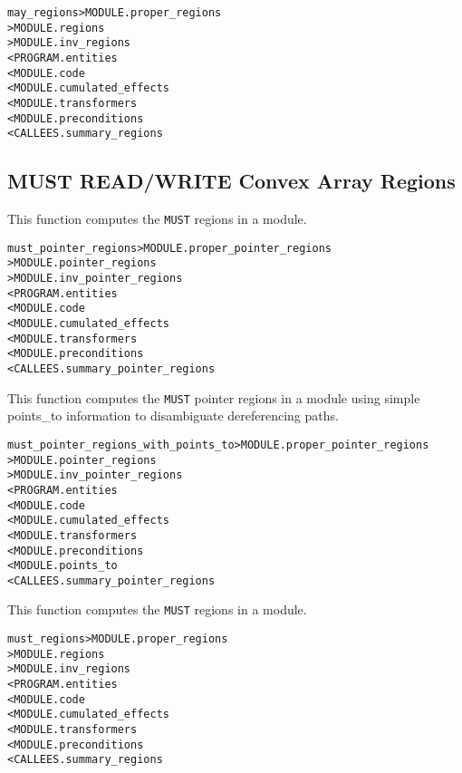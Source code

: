 \documentclass[a4paper]{report}
\newenvironment{PipsMake}{\begin{alltt}}{\end{alltt}}
\newenvironment{PipsPass}[1]{\label{pass:#1}}{}
\begin{document}
\begin{PipsMake}
may_regions                     > MODULE.proper_regions
                                > MODULE.regions
                                > MODULE.inv_regions
        < PROGRAM.entities
        < MODULE.code
        < MODULE.cumulated_effects
        < MODULE.transformers
        < MODULE.preconditions
        < CALLEES.summary_regions
\end{PipsMake}

\subsection{MUST READ/WRITE Convex Array Regions}
\label{subsubsection-must-regions}

\begin{PipsPass}{must_pointer_regions}
This function computes the \verb|MUST| regions in a module.
\end{PipsPass}

\begin{PipsMake}
must_pointer_regions            > MODULE.proper_pointer_regions
                                > MODULE.pointer_regions
                                > MODULE.inv_pointer_regions
        < PROGRAM.entities
        < MODULE.code
        < MODULE.cumulated_effects
        < MODULE.transformers
        < MODULE.preconditions
        < CALLEES.summary_pointer_regions
\end{PipsMake}

\begin{PipsPass}{must_pointer_regions_with_points_to}
  This function computes the \verb|MUST| pointer regions in a module
  using simple points\_to information to disambiguate dereferencing paths.
\end{PipsPass}
\begin{PipsMake}
must_pointer_regions_with_points_to > MODULE.proper_pointer_regions
                                    > MODULE.pointer_regions
                                    > MODULE.inv_pointer_regions
        < PROGRAM.entities
        < MODULE.code
        < MODULE.cumulated_effects
        < MODULE.transformers
        < MODULE.preconditions
        < MODULE.points_to
        < CALLEES.summary_pointer_regions
\end{PipsMake}


\begin{PipsPass}{must_regions}
This function computes the \verb|MUST| regions in a module.
\end{PipsPass}
\begin{PipsMake}
must_regions                    > MODULE.proper_regions
                                > MODULE.regions
                                > MODULE.inv_regions
        < PROGRAM.entities
        < MODULE.code
        < MODULE.cumulated_effects
        < MODULE.transformers
        < MODULE.preconditions
        < CALLEES.summary_regions
\end{PipsMake}
\end{document}
